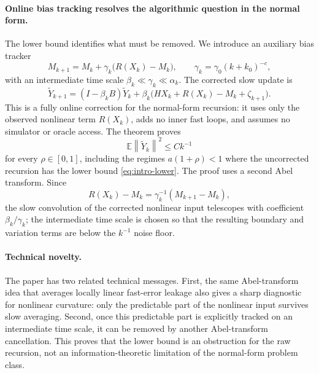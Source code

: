 \documentclass{article}
\newcommand{\E}{\mathbb{E}}
\newcommand{\norm}[1]{\left\lVert #1\right\rVert}
\begin{document}
\paragraph{Online bias tracking resolves the algorithmic question in the normal form.}
The lower bound identifies what must be removed. We introduce an auxiliary bias tracker
\begin{equation}
  M_{k+1}=M_k+\gamma_k\big(R(X_k)-M_k\big),
  \qquad
  \gamma_k=\gamma_0(k+k_0)^{-c}, \label{eq:intro-bias-tracker}
\end{equation}
with an intermediate time scale $\beta_k\ll\gamma_k\ll\alpha_k$. The corrected slow update is
\begin{equation}
  \widetilde Y_{k+1}
  =(I-\beta_kB)\widetilde Y_k
  +\beta_k\big(HX_k+R(X_k)-M_k+\zeta_{k+1}\big). \label{eq:intro-debiased}
\end{equation}
This is a fully online correction for the normal-form recursion: it uses only the observed nonlinear term $R(X_k)$, adds no inner fast loops, and assumes no simulator or oracle access. The theorem proves
\[
  \E\norm{\widetilde Y_k}^2\le Ck^{-1}
\]
for every $\rho\in[0,1]$, including the regimes $a(1+\rho)<1$ where the uncorrected recursion has the lower bound \eqref{eq:intro-lower}. The proof uses a second Abel transform. Since
\[
  R(X_k)-M_k=\gamma_k^{-1}(M_{k+1}-M_k),
\]
the slow convolution of the corrected nonlinear input telescopes with coefficient $\beta_k/\gamma_k$; the intermediate time scale is chosen so that the resulting boundary and variation terms are below the $k^{-1}$ noise floor.

\paragraph{Technical novelty.}
The paper has two related technical messages. First, the same Abel-transform idea that averages locally linear fast-error leakage also gives a sharp diagnostic for nonlinear curvature: only the predictable part of the nonlinear input survives slow averaging. Second, once this predictable part is explicitly tracked on an intermediate time scale, it can be removed by another Abel-transform cancellation. This proves that the lower bound is an obstruction for the raw recursion, not an information-theoretic limitation of the normal-form problem class.
\end{document}
